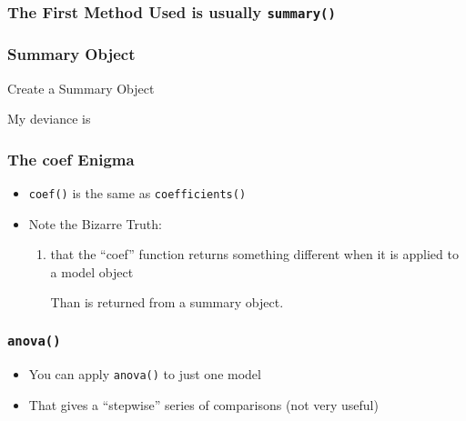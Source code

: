 \documentclass[10pt,english]{beamer}
\begin{document}
\begin{frame}
  \frametitle{The First Method Used is usually \texttt{summary()}}



\end{frame}


\begin{frame}
  \frametitle{Summary Object}

  Create a Summary Object


 My deviance is



\end{frame}


\begin{frame}
  \frametitle{The coef Enigma}

  \begin{itemize}
  \item \texttt{coef()} is the same as \texttt{coefficients()}

  \item Note the Bizarre Truth:
    \begin{enumerate}
    \item that the ``coef'' function returns
something different when it is applied to a model object


Than is returned from a summary object.


\end{enumerate}
\end{itemize}
\end{frame}






\begin{frame}
  \frametitle{\texttt{anova()}}
  \begin{itemize}
    \item You can apply \texttt{anova()} to just one model
    \item That gives a ``stepwise'' series of comparisons (not very useful)


\end{itemize}
\end{frame}

\end{document}

